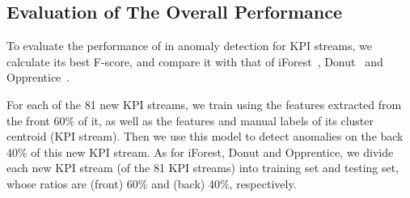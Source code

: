 \subsection{Evaluation of The Overall Performance}
\label{subsec:overall-performance}







To evaluate the performance of \name{} in anomaly detection for KPI streams, we calculate its best F-score, and compare it with that of iForest~\cite{ding2013anomaly}, Donut~\cite{xu2018unsupervised} and Opprentice~\cite{liu2015opprentice}.

For each of the 81 new KPI streams, we train \name{} using the features extracted from the front 60\% of it, as well as the features and manual labels of its cluster centroid (KPI stream).
 Then we use this \name{} model to detect anomalies on the back 40\% of this new KPI stream.
As for iForest, Donut and Opprentice, we divide each new KPI stream (of the 81 KPI streams) into training set and testing set, whose ratios are (front) 60\% and (back) 40\%, respectively.
  
